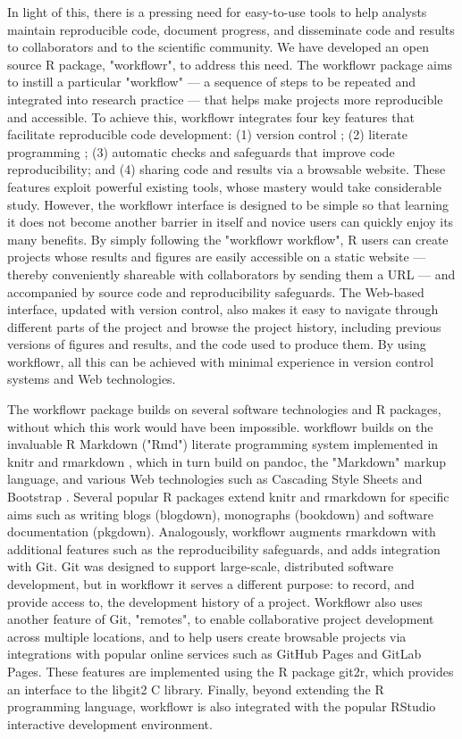 \documentclass[9pt,a4paper]{extarticle}
\begin{document}
In light of this, there is a pressing need for easy-to-use tools to help
analysts maintain reproducible code, document progress, and disseminate
code and results to collaborators and to the scientific community. We
have developed an open source R \cite{R2019} package, "workflowr", to
address this need. The workflowr package aims to instill a particular
"workflow" --- a sequence of steps to be repeated and integrated into
research practice --- that helps make projects more reproducible and
accessible. To achieve this, workflowr integrates four key features that
facilitate reproducible code development: (1) version control
\cite{Loeliger2012, Chacon2014}; (2) literate programming
\cite{Xie2018}; (3) automatic checks and safeguards that improve code
reproducibility; and (4) sharing code and results via a browsable
website. These features exploit powerful existing tools, whose mastery
would take considerable study. However, the workflowr interface is
designed to be simple so that learning it does not become another
barrier in itself and novice users can quickly enjoy its many benefits.
By simply following the "workflowr workflow", R users can create
projects whose results and figures are easily accessible on a static
website --- thereby conveniently shareable with collaborators by sending
them a URL --- and accompanied by source code and reproducibility
safeguards. The Web-based interface, updated with version control, also
makes it easy to navigate through different parts of the project and
browse the project history, including previous versions of figures and
results, and the code used to produce them. By using workflowr, all this
can be achieved with minimal experience in version control systems and
Web technologies.

The workflowr package builds on several software technologies and R
packages, without which this work would have been impossible. workflowr
builds on the invaluable R Markdown ("Rmd") literate programming system
implemented in knitr \cite{Xie2014, knitr} and rmarkdown \cite{Xie2018,
rmarkdown}, which in turn build on pandoc, the "Markdown" markup
language, and various Web technologies such as Cascading Style Sheets
and Bootstrap \cite{Spurlock2013}. Several popular R packages extend
knitr and rmarkdown for specific aims such as writing blogs (blogdown),
monographs (bookdown) and software documentation (pkgdown). Analogously,
workflowr augments rmarkdown with additional features such as the
reproducibility safeguards, and adds integration with Git. Git was
designed to support large-scale, distributed software development, but
in workflowr it serves a different purpose: to record, and provide
access to, the development history of a project. Workflowr also uses
another feature of Git, "remotes", to enable collaborative project
development across multiple locations, and to help users create
browsable projects via integrations with popular online services such as
GitHub Pages and GitLab Pages. These features are implemented using the
R package git2r, which provides an interface to the libgit2 C library.
Finally, beyond extending the R programming language, workflowr is also
integrated with the popular RStudio interactive development environment.
\end{document}
